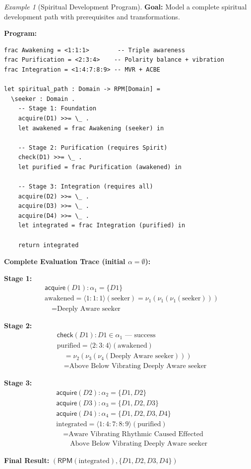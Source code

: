 \documentclass[11pt,twoside,openright]{book}
\theoremstyle{definition}
\theoremstyle{plain}
\theoremstyle{remark}
\newtheorem{example}[definition]{Example}
\newcommand{\noe}[1]{\nu_{#1}}
\begin{document}
\begin{example}[Spiritual Development Program]
\label{ex:spiritual-development}
\textbf{Goal:} Model a complete spiritual development path with prerequisites and transformations.

\textbf{Program:}
\begin{verbatim}
frac Awakening = <1:1:1>        -- Triple awareness
frac Purification = <2:3:4>    -- Polarity balance + vibration
frac Integration = <1:4:7:8:9> -- MVR + ACBE

let spiritual_path : Domain -> RPM[Domain] =
  \seeker : Domain .
    -- Stage 1: Foundation
    acquire(D1) >>= \_ .
    let awakened = frac Awakening (seeker) in

    -- Stage 2: Purification (requires Spirit)
    check(D1) >>= \_ .
    let purified = frac Purification (awakened) in

    -- Stage 3: Integration (requires all)
    acquire(D2) >>= \_ .
    acquire(D3) >>= \_ .
    acquire(D4) >>= \_ .
    let integrated = frac Integration (purified) in

    return integrated
\end{verbatim}

\textbf{Complete Evaluation Trace (initial $\alpha = \emptyset$):}

\textbf{Stage 1:}
\begin{align}
&\mathsf{acquire}(D1): \alpha_1 = \{D1\} \\
&\text{awakened} = \langle 1:1:1 \rangle(\text{seeker}) = \noe{1}(\noe{1}(\noe{1}(\text{seeker}))) \\
&\quad = \text{Deeply Aware seeker}
\end{align}

\textbf{Stage 2:}
\begin{align}
&\mathsf{check}(D1): D1 \in \alpha_1 \text{ — success} \\
&\text{purified} = \langle 2:3:4 \rangle(\text{awakened}) \\
&\quad = \noe{2}(\noe{3}(\noe{4}(\text{Deeply Aware seeker}))) \\
&\quad = \text{Above Below Vibrating Deeply Aware seeker}
\end{align}

\textbf{Stage 3:}
\begin{align}
&\mathsf{acquire}(D2): \alpha_2 = \{D1, D2\} \\
&\mathsf{acquire}(D3): \alpha_3 = \{D1, D2, D3\} \\
&\mathsf{acquire}(D4): \alpha_4 = \{D1, D2, D3, D4\} \\
&\text{integrated} = \langle 1:4:7:8:9 \rangle(\text{purified}) \\
&\quad = \text{Aware Vibrating Rhythmic Caused Effected} \\
&\quad\quad \text{Above Below Vibrating Deeply Aware seeker}
\end{align}

\textbf{Final Result:} $(\mathsf{RPM}(\text{integrated}), \{D1, D2, D3, D4\})$
\end{example}
\end{document}
